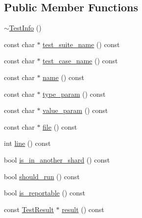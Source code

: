 \subsection*{Public Member Functions}
\begin{DoxyCompactItemize}
\item 
\hyperlink{classtesting_1_1TestInfo_a8d382c1b1b511f0d9112c14684809852}{$\sim$\+Test\+Info} ()
\item 
const char $\ast$ \hyperlink{classtesting_1_1TestInfo_a82a84ffd0e4d18eb5a3f97a2077e12cc}{test\+\_\+suite\+\_\+name} () const
\item 
const char $\ast$ \hyperlink{classtesting_1_1TestInfo_a036a20710c8c2252889544daba9a8ff9}{test\+\_\+case\+\_\+name} () const
\item 
const char $\ast$ \hyperlink{classtesting_1_1TestInfo_ac2581b45eccc9a3b94cb41c4807d0e34}{name} () const
\item 
const char $\ast$ \hyperlink{classtesting_1_1TestInfo_a7759bc57f4350ad406cbbb0b3bcea320}{type\+\_\+param} () const
\item 
const char $\ast$ \hyperlink{classtesting_1_1TestInfo_abdf2c6cfcf4819e725816c64e1c1fc24}{value\+\_\+param} () const
\item 
const char $\ast$ \hyperlink{classtesting_1_1TestInfo_a9b74d79cf618ce5bb0d0b1da75ee8b35}{file} () const
\item 
int \hyperlink{classtesting_1_1TestInfo_af5931cfc594b5d660c56b3c61c41ea13}{line} () const
\item 
bool \hyperlink{classtesting_1_1TestInfo_a8621f2cf7623fd1609db8e324f0c2fec}{is\+\_\+in\+\_\+another\+\_\+shard} () const
\item 
bool \hyperlink{classtesting_1_1TestInfo_a866e33b5bc5ab2a6e5375fc7d3af0f96}{should\+\_\+run} () const
\item 
bool \hyperlink{classtesting_1_1TestInfo_a63e7042028b0b846f4b5a1e5bcffc079}{is\+\_\+reportable} () const
\item 
const \hyperlink{classtesting_1_1TestResult}{Test\+Result} $\ast$ \hyperlink{classtesting_1_1TestInfo_aee8cb884c95cd446129aba936b4159e0}{result} () const
\end{DoxyCompactItemize}
